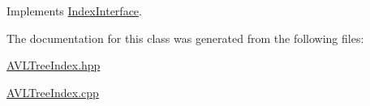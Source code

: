 Implements \hyperlink{class_index_interface_a7b2ae510fa62eebb654708b90972c1b6}{Index\+Interface}.



The documentation for this class was generated from the following files\+:\begin{DoxyCompactItemize}
\item 
\hyperlink{_a_v_l_tree_index_8hpp}{A\+V\+L\+Tree\+Index.\+hpp}\item 
\hyperlink{_a_v_l_tree_index_8cpp}{A\+V\+L\+Tree\+Index.\+cpp}\end{DoxyCompactItemize}
